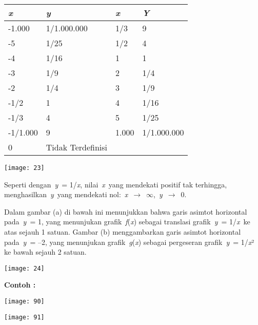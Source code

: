 \documentclass[11pt,fleqn]{book} %
\begin{document}
\begin{tabular}{|p{1.1in}|p{1.1in}|p{1.1in}|p{1.1in}|} \hline 
\textit{x} & \textit{y} & \textit{x} & \textit{Y} \\ \hline 
-1.000 & 1/1.000.000 & 1/3 & 9 \\ \hline 
-5 & 1/25 & 1/2 & 4 \\ \hline 
-4 & 1/16 & 1 & 1 \\ \hline 
-3 & 1/9 & 2 & 1/4 \\ \hline 
-2 & 1/4 & 3 & 1/9 \\ \hline 
-1/2 & 1 & 4 & 1/16 \\ \hline 
-1/3 & 4 & 5 & 1/25 \\ \hline 
-1/1.000 & 9 & 1.000 & 1/1.000.000 \\ \hline 
0 & Tidak Terdefinisi &  &  \\ \hline 
\end{tabular}

\begin{center}
\texttt{[image: 23]}
\end{center}

Seperti dengan~\textit{y}~= 1/\textit{x}, nilai~\textit{x}~yang mendekati positif tak terhingga, menghasilkan~\textit{y}~yang mendekati nol:~\textit{x}~$\mathrm{\to}$~$\mathrm{\infty}$,~\textit{y}~$\mathrm{\to}$~0. 

Dalam gambar (a) di bawah ini menunjukkan bahwa garis asimtot horizontal pada~\textit{y}~= 1, yang menunjukan grafik~\textit{f}(\textit{x}) sebagai translasi grafik~\textit{y}~= 1/\textit{x}~ke atas sejauh 1 satuan. Gambar (b) menggambarkan garis asimtot horizontal pada~\textit{y}~= --2, yang menunjukan grafik~\textit{g}(\textit{x}) sebagai pergeseran grafik~\textit{y}~= 1/\textit{x}² ke bawah sejauh 2 satuan.

\begin{center}
\texttt{[image: 24]}
\end{center}

\textbf{Contoh :}

\begin{center}
\texttt{[image: 90]}
\end{center}

\begin{center}
\texttt{[image: 91]}
\end{center}
\end{document}

